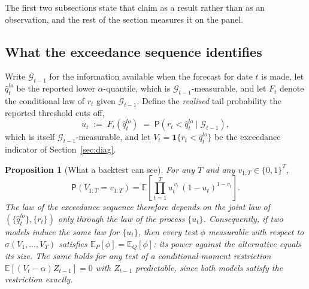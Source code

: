 \documentclass[preprint,11pt,authoryear]{elsarticle}
\newtheorem{proposition}[theorem]{Proposition}
\newcommand{\E}{\mathbb{E}}
\renewcommand{\P}{\mathsf{P}}
\newcommand{\1}{\boldsymbol{1}}
\begin{document}
The first two subsections state that claim as a result rather than as an
observation, and the rest of the section measures it on the panel.

\subsection{What the exceedance sequence identifies}
\label{sec:blindspot_identification}

Write $\mathcal G_{t-1}$ for the information available when the forecast for date
$t$ is made, let $\hat q^{lo}_t$ be the reported lower $\alpha$-quantile, which is
$\mathcal G_{t-1}$-measurable, and let $F_t$ denote the conditional law of $r_t$
given $\mathcal G_{t-1}$. Define the \emph{realised} tail probability the reported
threshold cuts off,
\begin{equation}
	\label{eq:u_process}
	u_t \;:=\; F_t\!\left(\hat q^{lo}_t\right)
	\;=\; \P\!\left(r_t < \hat q^{lo}_t \mid \mathcal G_{t-1}\right),
\end{equation}
which is itself $\mathcal G_{t-1}$-measurable, and let
$V_t = \mathbf 1\{r_t < \hat q^{lo}_t\}$ be the exceedance indicator of
Section~\ref{sec:diag}.

\begin{proposition}[What a backtest can see]
	\label{prop:identification}
	For any $T$ and any $v_{1:T}\in\{0,1\}^T$,
	\begin{equation}
		\label{eq:path_likelihood}
		\P\left(V_{1:T}=v_{1:T}\right)
		=
		\E\left[\prod_{t=1}^{T} u_t^{\,v_t}\,(1-u_t)^{1-v_t}\right].
	\end{equation}
	The law of the exceedance sequence therefore depends on the joint law of
	$(\{\hat q^{lo}_t\},\{r_t\})$ only through the law of the process
	$\{u_t\}$. Consequently, if two models induce the same law for $\{u_t\}$,
	then every test $\phi$ measurable with respect to $\sigma(V_1,\dots,V_T)$
	satisfies $\E_P[\phi]=\E_Q[\phi]$: its power against the alternative equals
	its size. The same holds for any test of a conditional-moment restriction
	$\E[(V_t-\alpha)Z_{t-1}]=0$ with $Z_{t-1}$ predictable, since both models
	satisfy the restriction exactly.
\end{proposition}
\end{document}
